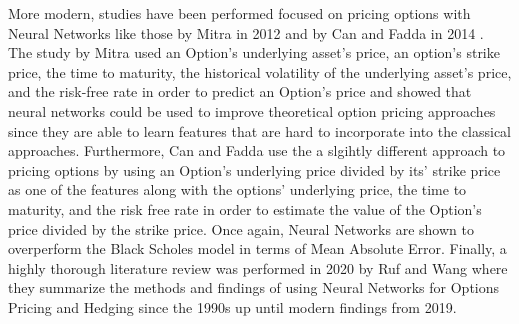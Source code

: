 \documentclass[a4paper]{article}
\begin{document}
More modern, studies have been performed focused on pricing options with Neural Networks like those by Mitra in 2012 \cite{mitra2012option} and by Can and Fadda in 2014 \cite{can2014nonparametric}. The study by Mitra used an Option's underlying asset's price, an option's strike price, the time to maturity, the historical volatility of the underlying asset's price, and the risk-free rate in order to predict an Option's price and showed that neural networks could be used to improve theoretical option pricing approaches since they are able to learn features that are hard to incorporate into the classical approaches. Furthermore, Can and Fadda use the a slgihtly different approach to pricing options by using an Option's underlying price divided by its' strike price as one of the features along with the options' underlying price, the time to maturity, and the risk free rate in order to estimate the value of the Option's price divided by the strike price. Once again, Neural Networks are shown to overperform the Black Scholes model in terms of Mean Absolute Error. Finally, a highly thorough literature review was performed in 2020 by Ruf and Wang \cite{ruf2020neural} where they summarize the methods and findings of using Neural Networks for Options Pricing and Hedging since the 1990s up until modern findings from 2019.
\end{document}
